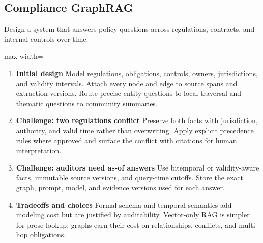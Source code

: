 \subsection{Compliance GraphRAG}
Design a system that answers policy questions across regulations, contracts, and internal controls over time.
\begin{center}\begin{adjustbox}{max width=\linewidth}\end{adjustbox}\end{center}
\begin{enumerate}
\item \textbf{Initial design} Model regulations, obligations, controls, owners, jurisdictions, and validity intervals. Attach every node and edge to source spans and extraction versions. Route precise entity questions to local traversal and thematic questions to community summaries.
\item \textbf{Challenge: two regulations conflict} Preserve both facts with jurisdiction, authority, and valid time rather than overwriting. Apply explicit precedence rules where approved and surface the conflict with citations for human interpretation.
\item \textbf{Challenge: auditors need as-of answers} Use bitemporal or validity-aware facts, immutable source versions, and query-time cutoffs. Store the exact graph, prompt, model, and evidence versions used for each answer.
\item \textbf{Tradeoffs and choices} Formal schema and temporal semantics add modeling cost but are justified by auditability. Vector-only RAG is simpler for prose lookup; graphs earn their cost on relationships, conflicts, and multi-hop obligations.
\end{enumerate}
